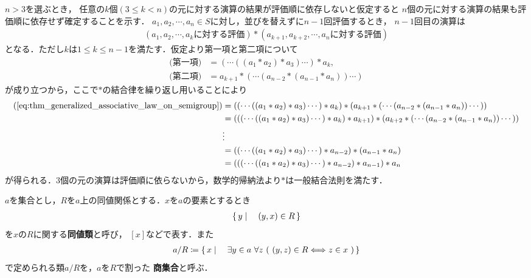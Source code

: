 	\begin{prf}
		$n > 3$を選ぶとき，
		任意の$k$個$(3 \leq k < n)$の元に対する演算の結果が評価順に依存しないと仮定すると
		$n$個の元に対する演算の結果も評価順に依存せず確定することを示す．
		$a_1,a_2,\cdots,a_n \in S$に対し，並びを替えずに$n-1$回評価するとき，
		$n-1$回目の演算は
		\begin{align}
			(\mbox{$a_1,a_2,\cdots,a_k$に対する評価}) \ast
			(\mbox{$a_{k+1},a_{k+2},\cdots,a_n$に対する評価})
			\label{eq:thm_generalized_associative_law_on_semigroup}
		\end{align}
		となる．ただし$k$は$1 \leq k \leq n-1$を満たす．仮定より第一項と第二項について
		\begin{align}
			\mbox{(第一項)} &= (\cdots((a_1 \ast a_2) \ast a_3)\cdots) \ast a_k, \\
			\mbox{(第二項)} &= a_{k+1} \ast (\cdots(a_{n-2} \ast (a_{n-1} \ast a_n))\cdots)
		\end{align}
		が成り立つから，ここで$\ast$の結合律を繰り返し用いることにより
		\begin{align}
			(\refeq{eq:thm_generalized_associative_law_on_semigroup}) 
			&= ((\cdots((a_1 \ast a_2) \ast a_3)\cdots) \ast a_k) \ast (a_{k+1} \ast (\cdots(a_{n-2} \ast (a_{n-1} \ast a_n))\cdots)) \\
			&= (((\cdots((a_1 \ast a_2) \ast a_3)\cdots) \ast a_k) \ast a_{k+1}) \ast (a_{k+2} \ast (\cdots(a_{n-2} \ast (a_{n-1} \ast a_n))\cdots)) \\
			&\vdots \\
			&= ((\cdots((a_1 \ast a_2) \ast a_3)\cdots) \ast a_{n-2}) \ast (a_{n-1} \ast a_n) \\
			&= (((\cdots((a_1 \ast a_2) \ast a_3)\cdots) \ast a_{n-2}) \ast a_{n-1}) \ast a_n
		\end{align}
		が得られる．$3$個の元の演算は評価順に依らないから，数学的帰納法より$\ast$は一般結合法則を満たす．
		\QED
	\end{prf}
	
	\begin{screen}
		\begin{dfn}[商集合]
			$a$を集合とし，$R$を$a$上の同値関係とする．$x$を$a$の要素とするとき
			\begin{align}
				\left\{\, y \mid \quad (y,x) \in R\, \right\}
			\end{align}
			を$x$の$R$に関する{\bf 同値類}と呼び，
			$[x]$などで表す．また
			\begin{align}
				a / R \coloneqq \Set{x}{\exists y \in a\ \forall z\ (\ (y,z) \in R \Longleftrightarrow z \in x\ )}
			\end{align}
			で定められる類$a/R$を，$a$を$R$で割った
			{\bf 商集合}と呼ぶ．
		\end{dfn}
	\end{screen}
	
